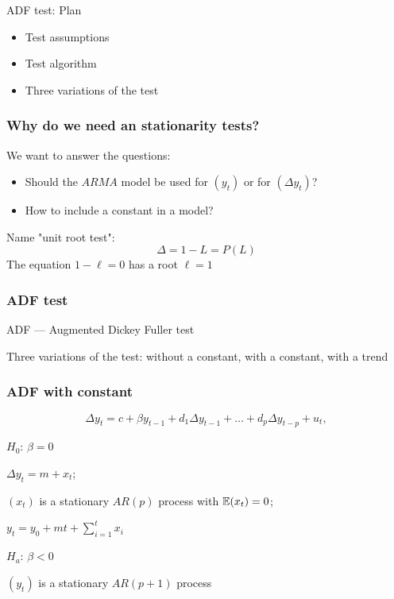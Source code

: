 

\begin{frame} %
	
	
\end{frame}




\begin{frame}{ADF test: Plan}
	\begin{itemize}[<+->]
		\item Test assumptions
		\item Test algorithm
		\item Three variations of the test
	\end{itemize}
	
\end{frame}




\begin{frame}
	\frametitle{Why do we need an stationarity tests?}
	
	We want to answer the questions:
	\pause
	\begin{itemize}[<+->]
		\item Should the $ARMA$ model be used for $(y_t)$ or for $(\Delta y_t)$?
		\item How to include a constant in a model?
	\end{itemize}
	
	\pause
	Name "unit root test":
	\pause
	\[
	\Delta = 1 - L = P(L)
	\]
	The equation $1 - \ell = 0$ has a root $\ell =1$
	
\end{frame}


\begin{frame}
	\frametitle{ADF test}
	
	ADF — \alert{Augmented Dickey Fuller} test
	
	\pause
	Three variations of the test: without a constant, with a constant, with a trend
	
\end{frame}


\begin{frame}
	\frametitle{ADF with constant}
	\[
	\Delta y_t = c + \beta y_{t-1} + d_1 \Delta y_{t-1} + \ldots + d_p \Delta y_{t-p} + u_t,
	\]
	
	\pause
	
	\alert{$H_0$: $\beta = 0$}
	
	$\Delta y_t = m + x_t$;
	
	$(x_t)$ is a stationary $AR(p)$ process with $\mathbb{E}(x_t) = 0$;
	
	$y_t = y_0 + mt + \sum_{i=1}^t x_i$
	
	\pause
	
	\alert{$H_a$: $\beta < 0$}
	
	$(y_t)$ is a stationary $AR(p + 1)$ process
	
\end{frame}

